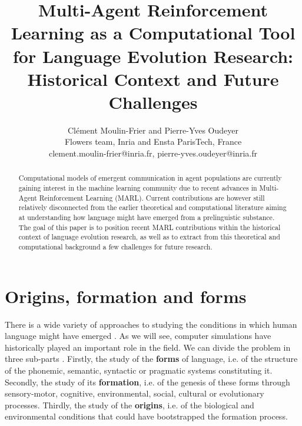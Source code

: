 \documentclass[letterpaper]{article} %
\title{Multi-Agent Reinforcement Learning as a Computational Tool for Language Evolution Research: Historical Context and Future Challenges }
\author{Cl\'{e}ment Moulin-Frier and Pierre-Yves Oudeyer\\ %
Flowers team, Inria and Ensta ParisTech, France\\ %
clement.moulin-frier@inria.fr, pierre-yves.oudeyer@inria.fr %
}
\begin{document}
\maketitle

\begin{abstract}
Computational models of emergent communication in agent populations are currently gaining interest in the machine learning community due to recent advances in Multi-Agent Reinforcement Learning (MARL). Current contributions are however still relatively disconnected from the earlier theoretical and computational literature aiming at understanding how language might have emerged from a prelinguistic substance. The goal of this paper is to position recent MARL contributions within the historical context of language evolution research, as well as to extract from this theoretical and computational background a few challenges for future research. 
\end{abstract}


\section{Origins, formation and forms}

There is a wide variety of approaches to studying the conditions in which human language might have emerged \cite{Christiansen2003}. As we will see, computer simulations have historically played an important role in the field. We can divide the problem in three sub-parts \cite{oudeyer:hal-00818204}. Firstly, the study of the \textbf{forms} of language, i.e. of the structure of the phonemic, semantic, syntactic or pragmatic systems constituting it. Secondly, the study of its \textbf{formation}, i.e. of the genesis of these forms through sensory-motor, cognitive, environmental, social, cultural or evolutionary processes. Thirdly, the study of the \textbf{origins}, i.e. of the biological and environmental conditions that could have bootstrapped the formation process. 
\end{document}
